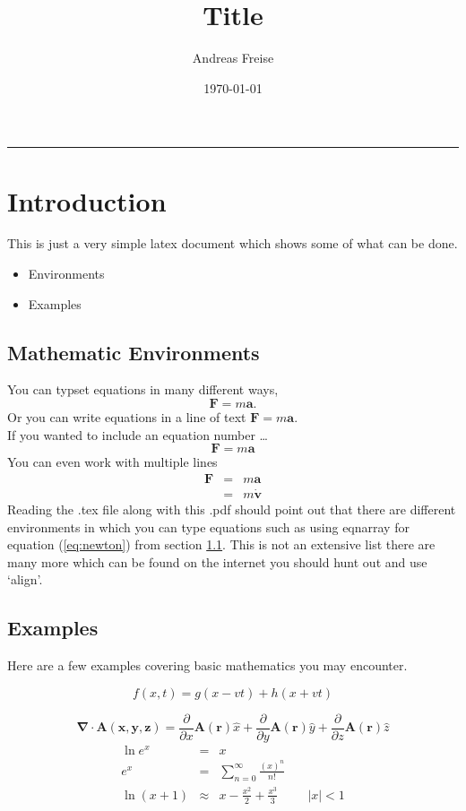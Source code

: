 \documentclass[pdf,color]{UoBnote}
\author{Andreas Freise}
\title{Title}
\date{\today}
\begin{document}
\maketitle
\tableofcontents
\vspace{1cm}\hrule \vspace{1cm}

\section{Introduction}

This is just a very simple latex document which shows some of what can be done.
\begin{itemize}
\item Environments
\item Examples
\end{itemize}
\subsection{Mathematic Environments}
\label{se:environments}
You can typset equations in many different ways,
\[
\mathbf{F} = m\mathbf{a}.
\]
Or you can write equations in a line of text $\mathbf{F} = m\mathbf{a}$. \\
If you wanted to include an equation number \dots
\begin{equation}
\mathbf{F} = m\mathbf{a}
\end{equation}
You can even work with multiple lines
\begin{eqnarray}
\mathbf{F} &=& m\mathbf{a} \nonumber \\
&=& m\mathbf{\dot{v}}
\label{eq:newton}
\end{eqnarray}
Reading the .tex file along with this .pdf should point out that there are different environments in which you can type equations such as using eqnarray for equation (\ref{eq:newton}) from section \ref{se:environments}. This is not an extensive list there are many more which can be found on the internet you should hunt out and use `align'.
\subsection{Examples}
Here are a few examples covering basic mathematics you may encounter.

\begin{equation}
f(x,t)=g(x-vt)+h(x+vt)
\end{equation}

\begin{equation}
\mathbf{\nabla}\cdot\mathbf{A}(\mathbf{x},\mathbf{y},\mathbf{z}) = \frac{\partial}{\partial x}\mathbf{A}(\mathbf{r})\hat{x} + \frac{\partial}{\partial y}\mathbf{A}(\mathbf{r})\hat{y} + \frac{\partial}{\partial z}\mathbf{A}(\mathbf{r})\hat{z}
\end{equation}
\begin{eqnarray*}
\ln e^{x} &=& x \\
e^{x} &=& \sum_{n=0}^{\infty}\frac{(x)^{n}}{n!} \\
\ln(x+1) &\approx& x - \frac{x^{2}}{2} + \frac{x^{3}}{3} \hspace{1cm} |x| < 1
\end{eqnarray*}
\end{document}
